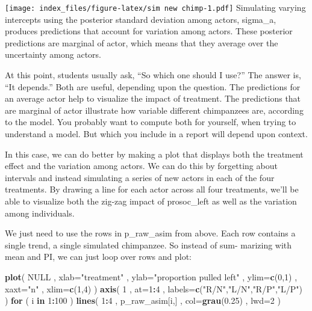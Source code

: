 \documentclass[
]{article}
\newenvironment{Shaded}{\begin{snugshade}}{\end{snugshade}}
\newcommand{\ControlFlowTok}[1]{\textcolor[rgb]{0.13,0.29,0.53}{\textbf{#1}}}
\newcommand{\DataTypeTok}[1]{\textcolor[rgb]{0.13,0.29,0.53}{#1}}
\newcommand{\DecValTok}[1]{\textcolor[rgb]{0.00,0.00,0.81}{#1}}
\newcommand{\FloatTok}[1]{\textcolor[rgb]{0.00,0.00,0.81}{#1}}
\newcommand{\KeywordTok}[1]{\textcolor[rgb]{0.13,0.29,0.53}{\textbf{#1}}}
\newcommand{\NormalTok}[1]{#1}
\newcommand{\OperatorTok}[1]{\textcolor[rgb]{0.81,0.36,0.00}{\textbf{#1}}}
\newcommand{\OtherTok}[1]{\textcolor[rgb]{0.56,0.35,0.01}{#1}}
\newcommand{\StringTok}[1]{\textcolor[rgb]{0.31,0.60,0.02}{#1}}
\begin{document}
\texttt{[image: index\_files/figure-latex/sim new chimp-1.pdf]}
Simulating varying intercepts using the posterior standard deviation
among actors, sigma\_a, produces predictions that account for variation
among actors. These posterior predictions are marginal of actor, which
means that they average over the uncertainty among actors.

At this point, students usually ask, ``So which one should I use?'' The
answer is, ``It depends.'' Both are useful, depending upon the question.
The predictions for an average actor help to visualize the impact of
treatment. The predictions that are marginal of actor illustrate how
variable different chimpanzees are, according to the model. You probably
want to compute both for yourself, when trying to understand a model.
But which you include in a report will depend upon context.

In this case, we can do better by making a plot that displays both the
treatment effect and the variation among actors. We can do this by
forgetting about intervals and instead simulating a series of new actors
in each of the four treatments. By drawing a line for each actor across
all four treatments, we'll be able to visualize both the zig-zag impact
of prosoc\_left as well as the variation among individuals.

We just need to use the rows in p\_raw\_asim from above. Each row
contains a single trend, a single simulated chimpanzee. So instead of
sum- marizing with mean and PI, we can just loop over rows and plot:

\begin{Shaded}
\begin{Highlighting}[]
\KeywordTok{plot}\NormalTok{( }\OtherTok{NULL}\NormalTok{ , }\DataTypeTok{xlab=}\StringTok{"treatment"}\NormalTok{ , }\DataTypeTok{ylab=}\StringTok{"proportion pulled left"}\NormalTok{ ,}
    \DataTypeTok{ylim=}\KeywordTok{c}\NormalTok{(}\DecValTok{0}\NormalTok{,}\DecValTok{1}\NormalTok{) , }\DataTypeTok{xaxt=}\StringTok{"n"}\NormalTok{ , }\DataTypeTok{xlim=}\KeywordTok{c}\NormalTok{(}\DecValTok{1}\NormalTok{,}\DecValTok{4}\NormalTok{) )}
\KeywordTok{axis}\NormalTok{( }\DecValTok{1}\NormalTok{ , }\DataTypeTok{at=}\DecValTok{1}\OperatorTok{:}\DecValTok{4}\NormalTok{ , }\DataTypeTok{labels=}\KeywordTok{c}\NormalTok{(}\StringTok{"R/N"}\NormalTok{,}\StringTok{"L/N"}\NormalTok{,}\StringTok{"R/P"}\NormalTok{,}\StringTok{"L/P"}\NormalTok{) )}
\ControlFlowTok{for}\NormalTok{ ( i }\ControlFlowTok{in} \DecValTok{1}\OperatorTok{:}\DecValTok{100}\NormalTok{ ) }\KeywordTok{lines}\NormalTok{( }\DecValTok{1}\OperatorTok{:}\DecValTok{4}\NormalTok{ , p_raw_asim[i,] , }\DataTypeTok{col=}\KeywordTok{grau}\NormalTok{(}\FloatTok{0.25}\NormalTok{) , }\DataTypeTok{lwd=}\DecValTok{2}\NormalTok{ )}
\end{Highlighting}
\end{Shaded}
\end{document}
